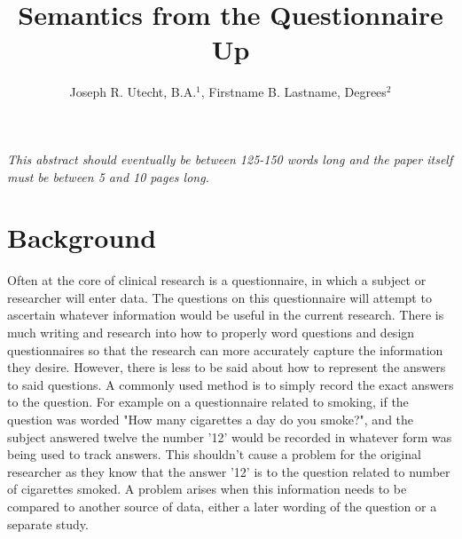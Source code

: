 \documentclass{amia}
\begin{document}
\title{Semantics from the Questionnaire Up}

\author{Joseph R. Utecht, B.A.$^{1}$, Firstname B. Lastname, Degrees$^{2}$}


\maketitle


\textit{This abstract should eventually be between 125-150 words long and the paper itself must be between 5 and 10 pages long.}

\section*{Background}
Often at the core of clinical research is a questionnaire, in which a subject or researcher will enter data.
The questions on this questionnaire will attempt to ascertain whatever information would be useful in the current research.
There is much writing and research into how to properly word questions and design questionnaires so that the research can more accurately capture the information they desire.
However, there is less to be said about how to represent the answers to said questions.
A commonly used method is to simply record the exact answers to the question.
For example on a questionnaire related to smoking, if the question was worded "How many cigarettes a day do you smoke?", and the subject answered twelve the number '12' would be recorded in whatever form was being used to track answers.
This shouldn't cause a problem for the original researcher as they know that the answer '12' is to the question related to number of cigarettes smoked.
A problem arises when this information needs to be compared to another source of data, either a later wording of the question or a separate study.
\end{document}
